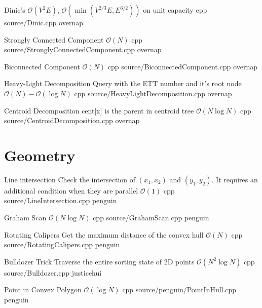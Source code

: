 \documentclass[landscape, 10pt, a4paper, oneside, twocolumn]{extarticle}
\begin{document}


\Algorithm
{Dinic's}
{}
{$\mathcal{O}(V^2E)$, $\mathcal{O}(\min{(V^{2/3}E,E^{3/2})})$ on unit capacity}
{cpp}
{source/Dinic.cpp}
{overnap}


\Algorithm
{Strongly Connected Component}
{}
{$\mathcal{O}(N)$}
{cpp}
{source/StronglyConnectedComponent.cpp}
{overnap}

\Algorithm
{Biconnected Component}
{}
{$\mathcal{O}(N)$}
{cpp}
{source/BiconnectedComponent.cpp}
{overnap}


\Algorithm
{Heavy-Light Decomposition}
{Query with the ETT number and it's root node}
{$\mathcal{O}(N)-\mathcal{O}(\log{N})$}
{cpp}
{source/HeavyLightDecomposition.cpp}
{overnap}

\Algorithm
{Centroid Decomposition}
{cent[x] is the parent in centroid tree}
{$\mathcal{O}(N\log{N})$}
{cpp}
{source/CentroidDecomposition.cpp}
{overnap}


\section{Geometry}

\Algorithm
{Line intersection}
{Check the intersection of $(x_1, x_2)$ and $(y_1, y_2)$. It requires an additional condition when they are parallel}
{$\mathcal{O}(1)$}
{cpp}
{source/LineIntersection.cpp}
{penguin}

\Algorithm
{Graham Scan}
{}
{$\mathcal{O}(N\log{N})$}
{cpp}
{source/GrahamScan.cpp}
{penguin}

\Algorithm
{Rotating Calipers}
{Get the maximum distance of the convex hull}
{$\mathcal{O}(N)$}
{cpp}
{source/RotatingCalipers.cpp}
{penguin}

\Algorithm
{Bulldozer Trick}
{Traverse the entire sorting state of 2D points}
{$\mathcal{O}(N^2\log{N})$}
{cpp}
{source/Bulldozer.cpp}
{justicehui}

\Algorithm
{Point in Convex Polygon}
{}
{$\mathcal{O}(\log{N})$}
{cpp}
{source/penguin/PointInHull.cpp}
{penguin}
\end{document}
